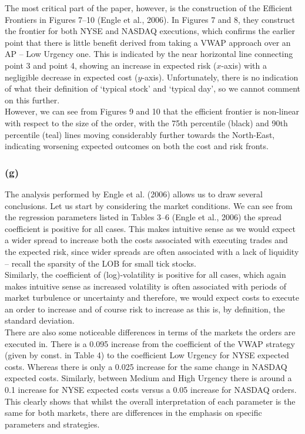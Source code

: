 \documentclass{article}
\begin{document}
The most critical part of the paper, however, is the construction of the Efficient Frontiers in Figures 7–10 (Engle et al., 2006). In Figures 7 and 8, they construct the frontier for both NYSE and NASDAQ executions, which confirms the earlier point that there is little benefit derived from taking a VWAP approach over an AP – Low Urgency one. This is indicated by the near horizontal line connecting point 3 and point 4, showing an increase in expected risk ($x$-axis) with a negligible decrease in expected cost ($y$-axis). Unfortunately, there is no indication of what their definition of ‘typical stock’ and ‘typical day’, so we cannot comment on this further. \\

However, we can see from Figures 9 and 10 that the efficient frontier is non-linear with respect to the size of the order, with the 75th percentile (black) and 90th percentile (teal) lines moving considerably further towards the North-East, indicating worsening expected outcomes on both the cost and risk fronts. \\


\subsubsection*{(g)}
The analysis performed by Engle et al. (2006) allows us to draw several conclusions. Let us start by considering the market conditions. We can see from the regression parameters listed in Tables 3–6 (Engle et al., 2006) the spread coefficient is positive for all cases. This makes intuitive sense as we would expect a wider spread to increase both the costs associated with executing trades and the expected risk, since wider spreads are often associated with a lack of liquidity – recall the sparsity of the LOB for small tick stocks. \\

Similarly, the coefficient of (log)-volatility is positive for all cases, which again makes intuitive sense as increased volatility is often associated with periods of market turbulence or uncertainty and therefore, we would expect costs to execute an order to increase and of course risk to increase as this is, by definition, the standard deviation. \\

There are also some noticeable differences in terms of the markets the orders are executed in. There is a 0.095 increase from the coefficient of the VWAP strategy (given by const. in Table 4) to the coefficient Low Urgency for NYSE expected costs. Whereas there is only a 0.025 increase for the same change in NASDAQ expected costs. Similarly, between Medium and High Urgency there is around a 0.1 increase for NYSE expected costs versus a 0.05 increase for NASDAQ orders. This clearly shows that whilst the overall interpretation of each parameter is the same for both markets, there are differences in the emphasis on specific parameters and strategies. \\
\end{document}
